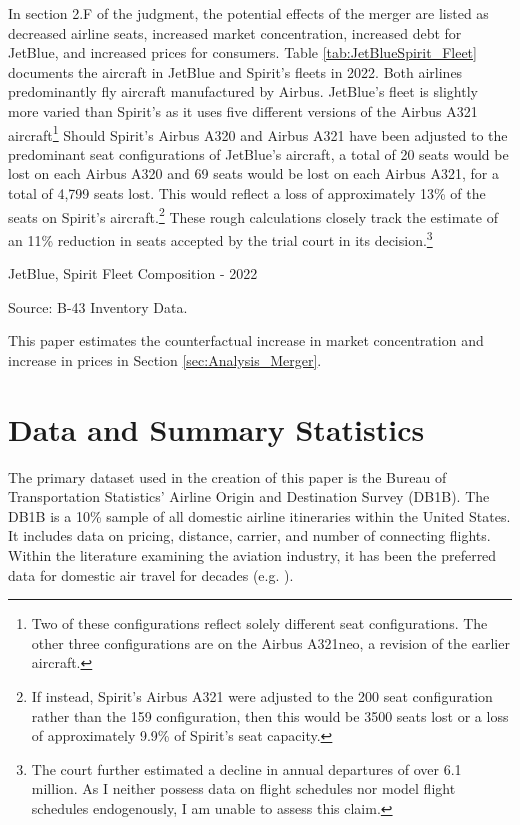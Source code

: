 \documentclass{article}
\begin{document}
	In section 2.F of the judgment, the potential effects of the merger are listed as decreased airline seats, increased market concentration, increased debt for JetBlue, and increased prices for consumers. Table \ref{tab:JetBlueSpirit_Fleet} documents the aircraft in JetBlue and Spirit's fleets in 2022. Both airlines predominantly fly aircraft manufactured by Airbus. JetBlue's fleet is slightly more varied than Spirit's as it uses five different versions of the Airbus A321 aircraft\footnote{Two of these configurations reflect solely different seat configurations. The other three configurations are on the Airbus A321neo, a revision of the earlier aircraft.} Should Spirit's Airbus A320 and Airbus A321 have been adjusted to the predominant seat configurations of JetBlue's aircraft, a total of 20 seats would be lost on each Airbus A320 and 69 seats would be lost on each Airbus A321, for a total of 4,799 seats lost. This would reflect a loss of approximately 13\% of the seats on Spirit's aircraft.\footnote{If instead, Spirit's Airbus A321 were adjusted to the 200 seat configuration rather than the 159 configuration, then this would be 3500 seats lost or a loss of approximately 9.9\% of Spirit's seat capacity.} These rough calculations closely track the estimate of an 11\% reduction in seats accepted by the trial court in its decision.\footnote{The court further estimated a decline in annual departures of over 6.1 million. As I neither possess data on flight schedules nor model flight schedules endogenously, I am unable to assess this claim.} 
    
    \begin{table}
        \begin{center}
            \caption{JetBlue, Spirit Fleet Composition - 2022}
            \label{tab:JetBlueSpirit_Fleet}
            \vspace{-10mm}
          
        \end{center}
        \footnotesize{Source: B-43 Inventory Data.}
    \end{table}

    This paper estimates the counterfactual increase in market concentration and increase in prices in Section \ref{sec:Analysis_Merger}. 

	\section{Data and Summary Statistics}
	\label{sec:Data}
	The primary dataset used in the creation of this paper is the Bureau of Transportation Statistics' Airline Origin and Destination Survey (DB1B). The DB1B is a 10\% sample of all domestic airline itineraries within the United States. It includes data on pricing, distance, carrier, and number of connecting flights. Within the literature examining the aviation industry, it has been the preferred data for domestic air travel for decades (e.g. \citet{ciliberto_market_2021, berry_tracing_2010, goolsbee_how_2008, peters_evaluating_2006}). 
\end{document}
